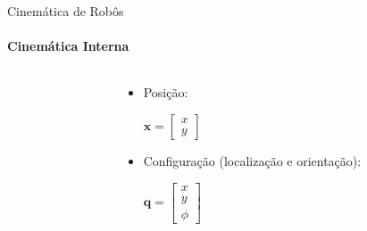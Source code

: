 \documentclass{beamer}
\begin{document}
\begin{frame}{Cinemática de Robôs}
    \framesubtitle{Cinemática Interna}
    \begin{columns}
        \begin{column}[c]{0.5\textwidth}
            \centering
            
        \end{column}
        \begin{column}[c]{0.5\textwidth}
            \centering
            \begin{itemize}
                \item Posição:
                \newline
                
                $\mathbf{x} = \begin{bmatrix}
                    x \\
                    y
                \end{bmatrix}$
                \newline

                \item Configuração (localização e orientação):
                \newline

                $\mathbf{q} = 
                \begin{bmatrix}
                    x \\
                    y\\
                    \phi
                \end{bmatrix}$
        \end{itemize}
        \end{column}
    \end{columns}   
\end{frame}
\end{document}
